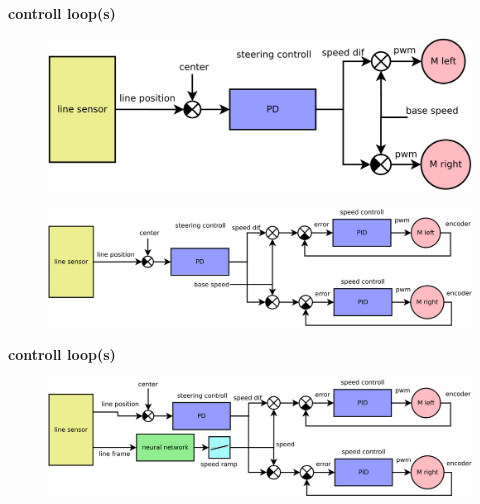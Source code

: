 \documentclass[xcolor=dvipsnames]{beamer}
\begin{document}
\begin{frame}{\bf controll loop(s)}
        \begin{figure}
            \includegraphics[scale=0.22]{../diagrams/line_following_basic.png}
        \end{figure}
        
        \begin{figure}
            \includegraphics[scale=0.22]{../diagrams/line_following_pid.png}
        \end{figure}
\end{frame}

\begin{frame}{\bf controll loop(s)}
        \begin{figure}
            \includegraphics[scale=0.22]{../diagrams/line_following.png}
        \end{figure}
\end{frame}
\end{document}
